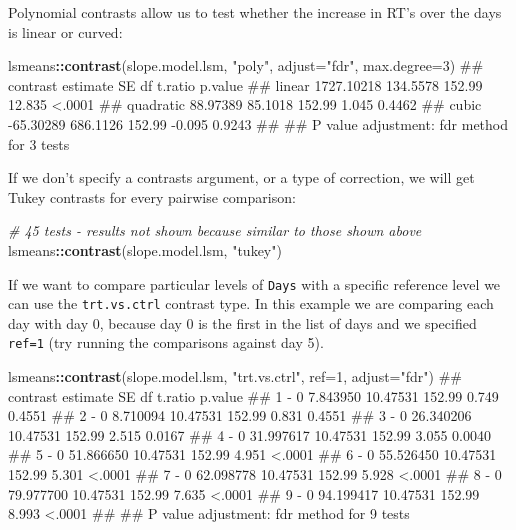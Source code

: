 \documentclass[]{article}
\newenvironment{Shaded}{\begin{snugshade}}{\end{snugshade}}
\newcommand{\KeywordTok}[1]{\textcolor[rgb]{0.13,0.29,0.53}{\textbf{#1}}}
\newcommand{\DataTypeTok}[1]{\textcolor[rgb]{0.13,0.29,0.53}{#1}}
\newcommand{\DecValTok}[1]{\textcolor[rgb]{0.00,0.00,0.81}{#1}}
\newcommand{\StringTok}[1]{\textcolor[rgb]{0.31,0.60,0.02}{#1}}
\newcommand{\CommentTok}[1]{\textcolor[rgb]{0.56,0.35,0.01}{\textit{#1}}}
\newcommand{\OperatorTok}[1]{\textcolor[rgb]{0.81,0.36,0.00}{\textbf{#1}}}
\newcommand{\NormalTok}[1]{#1}
\theoremstyle{definition}
\theoremstyle{definition}
\theoremstyle{definition}
\theoremstyle{remark}
\begin{document}
Polynomial contrasts allow us to test whether the increase in RT's over
the days is linear or curved:

\begin{Shaded}
\begin{Highlighting}[]
\NormalTok{lsmeans}\OperatorTok{::}\KeywordTok{contrast}\NormalTok{(slope.model.lsm, }\StringTok{"poly"}\NormalTok{, }\DataTypeTok{adjust=}\StringTok{"fdr"}\NormalTok{, }\DataTypeTok{max.degree=}\DecValTok{3}\NormalTok{)}
\NormalTok{##  contrast    estimate       SE     df t.ratio p.value}
\NormalTok{##  linear    1727.10218 134.5578 152.99  12.835  <.0001}
\NormalTok{##  quadratic   88.97389  85.1018 152.99   1.045  0.4462}
\NormalTok{##  cubic      -65.30289 686.1126 152.99  -0.095  0.9243}
\NormalTok{## }
\NormalTok{## P value adjustment: fdr method for 3 tests}
\end{Highlighting}
\end{Shaded}

If we don't specify a contrasts argument, or a type of correction, we
will get Tukey contrasts for every pairwise comparison:

\begin{Shaded}
\begin{Highlighting}[]
\CommentTok{# 45 tests - results not shown because similar to those shown above}
\NormalTok{lsmeans}\OperatorTok{::}\KeywordTok{contrast}\NormalTok{(slope.model.lsm, }\StringTok{"tukey"}\NormalTok{)}
\end{Highlighting}
\end{Shaded}

If we want to compare particular levels of \texttt{Days} with a specific
reference level we can use the \texttt{trt.vs.ctrl} contrast type. In
this example we are comparing each day with day 0, because day 0 is the
first in the list of days and we specified \texttt{ref=1} (try running
the comparisons against day 5).

\begin{Shaded}
\begin{Highlighting}[]
\NormalTok{lsmeans}\OperatorTok{::}\KeywordTok{contrast}\NormalTok{(slope.model.lsm, }\StringTok{"trt.vs.ctrl"}\NormalTok{, }\DataTypeTok{ref=}\DecValTok{1}\NormalTok{, }\DataTypeTok{adjust=}\StringTok{"fdr"}\NormalTok{)}
\NormalTok{##  contrast  estimate       SE     df t.ratio p.value}
\NormalTok{##  1 - 0     7.843950 10.47531 152.99   0.749  0.4551}
\NormalTok{##  2 - 0     8.710094 10.47531 152.99   0.831  0.4551}
\NormalTok{##  3 - 0    26.340206 10.47531 152.99   2.515  0.0167}
\NormalTok{##  4 - 0    31.997617 10.47531 152.99   3.055  0.0040}
\NormalTok{##  5 - 0    51.866650 10.47531 152.99   4.951  <.0001}
\NormalTok{##  6 - 0    55.526450 10.47531 152.99   5.301  <.0001}
\NormalTok{##  7 - 0    62.098778 10.47531 152.99   5.928  <.0001}
\NormalTok{##  8 - 0    79.977700 10.47531 152.99   7.635  <.0001}
\NormalTok{##  9 - 0    94.199417 10.47531 152.99   8.993  <.0001}
\NormalTok{## }
\NormalTok{## P value adjustment: fdr method for 9 tests}
\end{Highlighting}
\end{Shaded}
\end{document}
